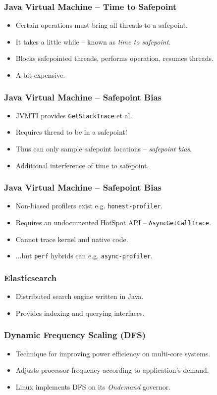\documentclass{beamer}
\begin{document}
\begin{frame}
\frametitle{Java Virtual Machine -- Time to Safepoint}
\begin{itemize}
\item Certain operations must bring all threads to a safepoint.
\item It takes a little while -- known as \emph{time to safepoint}.
\item Blocks safepointed threads, performs operation, resumes threads.
\item A bit expensive.
\end{itemize}
\end{frame}

\begin{frame}
\frametitle{Java Virtual Machine -- Safepoint Bias}
\begin{itemize}
\item JVMTI provides \lstinline{GetStackTrace} et al.
\item Requires thread to be in a safepoint!
\item Thus can only sample safepoint locations -- \emph{safepoint bias}.
\item Additional interference of time to safepoint.
\end{itemize}
\end{frame}

\begin{frame}
\frametitle{Java Virtual Machine -- Safepoint Bias}
\begin{itemize}
\item Non-biased profilers exist e.g. \lstinline{honest-profiler}.
\item Requires an undocumented HotSpot API -- \lstinline{AsyncGetCallTrace}.
\item Cannot trace kernel and native code.
\item ...but \lstinline{perf} hybrids can e.g. \lstinline{async-profiler}.
\end{itemize}
\end{frame}

\begin{frame}
\frametitle{Elasticsearch}
\begin{itemize}
\item Distributed search engine written in Java.
\item Provides indexing and querying interfaces.
\end{itemize}
\end{frame}

\begin{frame}
\frametitle{Dynamic Frequency Scaling (DFS)}
\begin{itemize}
\item Technique for improving power efficiency on multi-core systems.
\item Adjusts processor frequency according to application's demand.
\item Linux implements DFS on its \emph{Ondemand} governor.
\end{itemize}
\end{frame}
\end{document}
